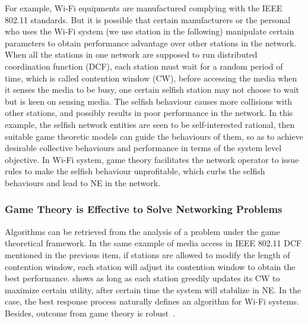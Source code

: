 For example, Wi-Fi equipments are manufactured complying with the IEEE 802.11 standards.
But it is possible that certain manufacturers or the personal who uses the Wi-Fi system (we use station in the following) manipulate certain parameters to obtain performance advantage over other stations in the network.
When all the stations in one network are supposed to run distributed coordination function (\gls{DCF}), \ie each station must wait for a random period of time, which is called contention window (\gls{CW}), before accessing the media when it senses the media to be busy, one certain selfish station may not choose to wait but is keen on sensing media.
The selfish behaviour causes more collisions with other stations, and possibly results in poor performance in the network.
In this example, the selfish network entities are seen to be self-interested rational, then suitable game theoretic models can guide the behaviours of them, so as to achieve desirable collective behaviours and performance in terms of the system level objective.
In Wi-Fi system, game theory facilitates the network operator to issue rules to make the selfish behaviour unprofitable, which curbs the selfish behaviours and lead to NE in the network.

\subsubsection{Game Theory is Effective to Solve Networking Problems}
Algorithms can be retrieved from the analysis of a problem under the game theoretical framework.
In the same example of media access in IEEE 802.11 DCF mentioned in the previous item, if stations are allowed to modify the length of contention window, each station will adjust its contention window to obtain the best performance.
\cite{contentiongame_07} shows as long as each station greedily updates its CW to maximize certain utility, after certain time the system will stabilize in NE. 
In the case, the best response process naturally defines an algorithm for Wi-Fi systems.
%
Besides, outcome from game theory is robust~\cite{Han:2008:RAW:1457343}.


